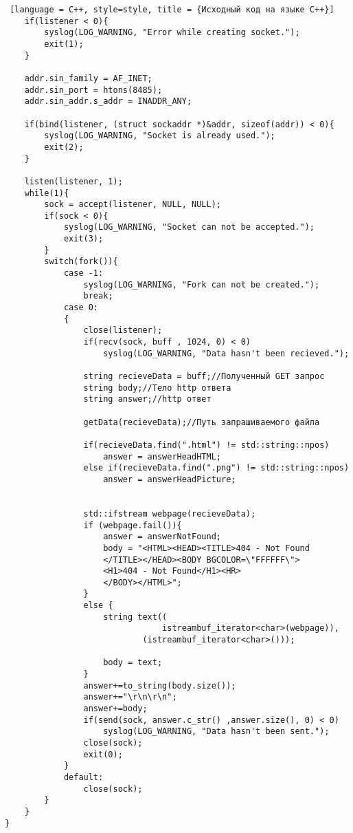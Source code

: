 \documentclass{article}
\begin{document}
\begin{lstlisting} [language = C++, style=style, title = {Исходный код на языке C++}]
    if(listener < 0){
        syslog(LOG_WARNING, "Error while creating socket.");
        exit(1);
    }

    addr.sin_family = AF_INET;
    addr.sin_port = htons(8485);
    addr.sin_addr.s_addr = INADDR_ANY;

    if(bind(listener, (struct sockaddr *)&addr, sizeof(addr)) < 0){
        syslog(LOG_WARNING, "Socket is already used.");
        exit(2);
    }

    listen(listener, 1);
    while(1){
        sock = accept(listener, NULL, NULL);
        if(sock < 0){
            syslog(LOG_WARNING, "Socket can not be accepted.");
            exit(3);
        }
        switch(fork()){
            case -1:
                syslog(LOG_WARNING, "Fork can not be created.");
                break;
            case 0:
            {
                close(listener);
                if(recv(sock, buff , 1024, 0) < 0)
                    syslog(LOG_WARNING, "Data hasn't been recieved.");

                string recieveData = buff;//Полученный GET запрос
                string body;//Тело http ответа
                string answer;//http ответ

                getData(recieveData);//Путь запрашиваемого файла

                if(recieveData.find(".html") != std::string::npos)
                    answer = answerHeadHTML;
                else if(recieveData.find(".png") != std::string::npos)
                    answer = answerHeadPicture;


                std::ifstream webpage(recieveData);
                if (webpage.fail()){
                    answer = answerNotFound;
					body = "<HTML><HEAD><TITLE>404 - Not Found
					</TITLE></HEAD><BODY BGCOLOR=\"FFFFFF\">
					<H1>404 - Not Found</H1><HR>
					</BODY></HTML>";
                }
                else {
                    string text((
                                istreambuf_iterator<char>(webpage)),
                            (istreambuf_iterator<char>()));

                    body = text;
                }
                answer+=to_string(body.size());
                answer+="\r\n\r\n";
                answer+=body;
                if(send(sock, answer.c_str() ,answer.size(), 0) < 0)
                    syslog(LOG_WARNING, "Data hasn't been sent.");
                close(sock);
                exit(0);
            }
            default:
                close(sock);
        }
    }
}
	\end{lstlisting}
\end{document}
